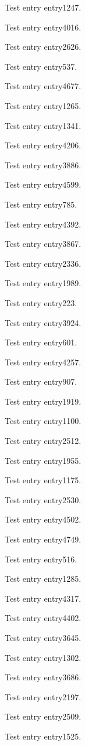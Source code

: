 Test entry \gls{entry1247}.

Test entry \gls{entry4016}.

Test entry \gls{entry2626}.

Test entry \gls{entry537}.

Test entry \gls{entry4677}.

Test entry \gls{entry1265}.

Test entry \gls{entry1341}.

Test entry \gls{entry4206}.

Test entry \gls{entry3886}.

Test entry \gls{entry4599}.

Test entry \gls{entry785}.

Test entry \gls{entry4392}.

Test entry \gls{entry3867}.

Test entry \gls{entry2336}.

Test entry \gls{entry1989}.

Test entry \gls{entry223}.

Test entry \gls{entry3924}.

Test entry \gls{entry601}.

Test entry \gls{entry4257}.

Test entry \gls{entry907}.

Test entry \gls{entry1919}.

Test entry \gls{entry1100}.

Test entry \gls{entry2512}.

Test entry \gls{entry1955}.

Test entry \gls{entry1175}.

Test entry \gls{entry2530}.

Test entry \gls{entry4502}.

Test entry \gls{entry4749}.

Test entry \gls{entry516}.

Test entry \gls{entry1285}.

Test entry \gls{entry4317}.

Test entry \gls{entry4402}.

Test entry \gls{entry3645}.

Test entry \gls{entry1302}.

Test entry \gls{entry3686}.

Test entry \gls{entry2197}.

Test entry \gls{entry2509}.

Test entry \gls{entry1525}.

